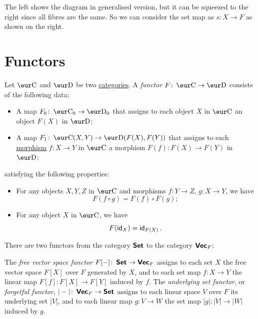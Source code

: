 The left shows the diagram in generalised version, but it can be squeezed to the right since all fibres are the same. So we can consider the set map as $s \colon X \to F$ as shown on the right.

\section{Functors}

\begin{definition}[Functor]\label{def:functor}
  Let $\Ca$ and $\D$ be two \hyperref[def:category]{categories}. A \emph{functor} $F \colon \Ca \to \D$ consists of the following data:
  \begin{itemize}
    \item A map $F_0 \colon \Ca_0 \to \D_0$ that assigns to each object $X$ in $\Ca$ an object $F(X)$ in $\D$;
    \item A map $F_1 \colon \Ca(X, Y) \to \D(F(X), F(Y))$ that assigns to each \hyperref[def:morphism]{morphism} $f \colon X \to Y$ in $\Ca$ a morphism $F(f) \colon F(X) \to F(Y)$ in $\D$;
  \end{itemize}
  satisfying the following properties:
  \begin{itemize}
    \item For any objects $X, Y, Z$ in $\Ca$ and morphisms $f \colon Y \to Z$, $g \colon X \to Y$, we have
          \[
            F(f \circ g) = F(f) \circ F(g);
          \]
    \item For any object $X$ in $\Ca$, we have
          \[
            F(\operatorname{\text{\normalfont\sffamily id}}_X) = \operatorname{\text{\normalfont\sffamily id}}_{F(X)}.
          \]
  \end{itemize}
\end{definition}

\begin{example}
  There are two functors from the category $\operatorname{\text{\normalfont\bf\sffamily Set}}$ to the category $\operatorname{\text{\normalfont\bf\sffamily Vec}}_F$:
  \begin{center}
  \end{center}
  The \emph{free vector space functor} $F[-] \colon \operatorname{\text{\normalfont\bf\sffamily Set}} \to \operatorname{\text{\normalfont\bf\sffamily Vec}}_F$ assigns to each set $X$ the free vector space $F[X]$ over $F$ generated by $X$, and to each set map $f \colon X \to Y$ the linear map $F[f] \colon F[X] \to F[Y]$ induced by $f$. The \emph{underlying set functor}, or \emph{forgetful functor}, $|-| \colon \operatorname{\text{\normalfont\bf\sffamily Vec}}_F \to \operatorname{\text{\normalfont\bf\sffamily Set}}$ assigns to each linear space $V$ over $F$ its underlying set $|V|$, and to each linear map $g \colon V \to W$ the set map $|g| \colon |V| \to |W|$ induced by $g$.
\end{example}


